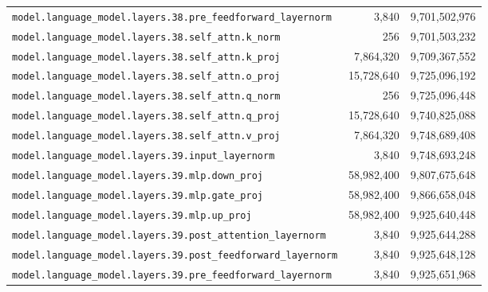 \documentclass[10pt,a4paper]{article}
\theoremstyle{definition}
\begin{document}
\begin{appendices}
\begin{longtable}{p{9.5cm}rr}
\texttt{model.\allowbreak{}language\_model.\allowbreak{}layers.\allowbreak{}38.\allowbreak{}pre\_feedforward\_layernorm} & 3,840 & 9,701,502,976 \\
\texttt{model.\allowbreak{}language\_model.\allowbreak{}layers.\allowbreak{}38.\allowbreak{}self\_attn.\allowbreak{}k\_norm} & 256 & 9,701,503,232 \\
\texttt{model.\allowbreak{}language\_model.\allowbreak{}layers.\allowbreak{}38.\allowbreak{}self\_attn.\allowbreak{}k\_proj} & 7,864,320 & 9,709,367,552 \\
\texttt{model.\allowbreak{}language\_model.\allowbreak{}layers.\allowbreak{}38.\allowbreak{}self\_attn.\allowbreak{}o\_proj} & 15,728,640 & 9,725,096,192 \\
\texttt{model.\allowbreak{}language\_model.\allowbreak{}layers.\allowbreak{}38.\allowbreak{}self\_attn.\allowbreak{}q\_norm} & 256 & 9,725,096,448 \\
\texttt{model.\allowbreak{}language\_model.\allowbreak{}layers.\allowbreak{}38.\allowbreak{}self\_attn.\allowbreak{}q\_proj} & 15,728,640 & 9,740,825,088 \\
\texttt{model.\allowbreak{}language\_model.\allowbreak{}layers.\allowbreak{}38.\allowbreak{}self\_attn.\allowbreak{}v\_proj} & 7,864,320 & 9,748,689,408 \\
\texttt{model.\allowbreak{}language\_model.\allowbreak{}layers.\allowbreak{}39.\allowbreak{}input\_layernorm} & 3,840 & 9,748,693,248 \\
\texttt{model.\allowbreak{}language\_model.\allowbreak{}layers.\allowbreak{}39.\allowbreak{}mlp.\allowbreak{}down\_proj} & 58,982,400 & 9,807,675,648 \\
\texttt{model.\allowbreak{}language\_model.\allowbreak{}layers.\allowbreak{}39.\allowbreak{}mlp.\allowbreak{}gate\_proj} & 58,982,400 & 9,866,658,048 \\
\texttt{model.\allowbreak{}language\_model.\allowbreak{}layers.\allowbreak{}39.\allowbreak{}mlp.\allowbreak{}up\_proj} & 58,982,400 & 9,925,640,448 \\
\texttt{model.\allowbreak{}language\_model.\allowbreak{}layers.\allowbreak{}39.\allowbreak{}post\_attention\_layernorm} & 3,840 & 9,925,644,288 \\
\texttt{model.\allowbreak{}language\_model.\allowbreak{}layers.\allowbreak{}39.\allowbreak{}post\_feedforward\_layernorm} & 3,840 & 9,925,648,128 \\
\texttt{model.\allowbreak{}language\_model.\allowbreak{}layers.\allowbreak{}39.\allowbreak{}pre\_feedforward\_layernorm} & 3,840 & 9,925,651,968 \\

\end{longtable}
\end{appendices}
\end{document}
